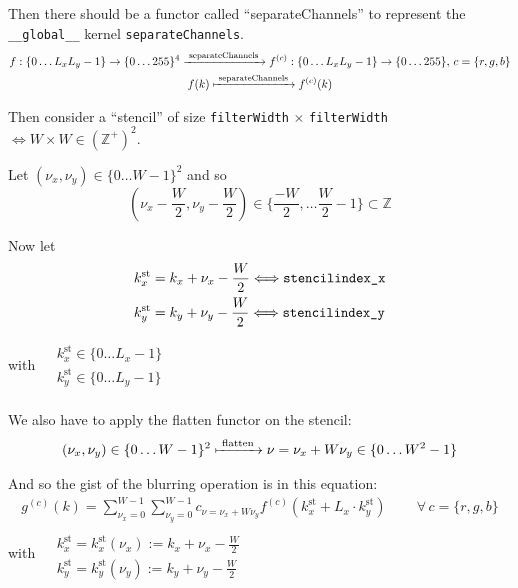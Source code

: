 \documentclass[10pt]{amsart}
\begin{document}
\begin{multicols*}{2}
Then there should be a functor called ``separateChannels'' to represent the \verb|__global__| kernel \verb|separateChannels|.
\[
\begin{gathered}
  f: \lbrace 0 \dots L_x L_y - 1 \rbrace \to \lbrace 0 \dots 255 \rbrace^4 \xrightarrow{ \text{ separateChannels } } f^{(c)}:\lbrace 0 \dots L_xL_y -1 \rbrace \to \lbrace 0 \dots 255 \rbrace , \, c = \lbrace r,g,b \rbrace \\ 
 f(k) \xmapsto{ \text{ separateChannels } } f^{(c)}(k)
\end{gathered}
\]

Then consider a ``stencil'' of size \verb|filterWidth| $\times$ \verb|filterWidth| $\Longleftrightarrow W \times W \in (\mathbb{Z}^+)^2$.

Let $(\nu_x,\nu_y) \in \lbrace 0 \dots W-1 \rbrace^2$ and so
\[
\left( \nu_x - \frac{W}{2} , \nu_y - \frac{W}{2} \right) \in \lbrace \frac{-W}{2} , \dots \frac{W}{2} - 1 \rbrace \subset \mathbb{Z}
\]

Now let
\[
\begin{aligned}
  &  k_x^{\text{st}} = k_x  + \nu_x - \frac{W}{2} \Longleftrightarrow \verb|stencilindex_x| \\ 
  & k_y^{\text{st}} = k_y  + \nu_y - \frac{W}{2} \Longleftrightarrow \verb|stencilindex_y| 
\end{aligned}
\]
with $\begin{aligned} & \quad \\
 &  k_x^{\text{st}} \in \lbrace 0 \dots L_x -1 \rbrace \\ 
  &  k_y^{\text{st}} \in \lbrace 0 \dots L_y -1 \rbrace \\
  \end{aligned}$

We also have to apply the flatten functor on the stencil:
\[
\begin{gathered}
  (\nu_x,\nu_y) \in \lbrace 0 \dots W-1\rbrace^2 \xmapsto{ \text{ flatten } } \nu = \nu_x + W \nu_y \in \lbrace 0 \dots W^2 -1 \rbrace
  \end{gathered}
\]

And so the gist of the blurring operation is in this equation:
\begin{equation}
\begin{gathered}
  g^{(c)}(k) = \sum_{\nu_x=0}^{W-1} \sum_{\nu_y =0}^{W-1} c_{\nu = \nu_x + W\nu_y} f^{(c)}(k_x^{\text{st}} + L_x \cdot k_y^{\text{st}} ) \qquad \, \forall \, c = \lbrace r,g,b\rbrace 
  \end{gathered}
  \end{equation}
with $\begin{aligned} & \quad \\
  & k_x^{\text{st}} = k_x^{\text{st}}(\nu_x) := k_x + \nu_x - \frac{W}{2} \\ 
  & k_y^{\text{st}} = k_y^{\text{st}}(\nu_y) := k_y + \nu_y - \frac{W}{2} 
  \end{aligned}$


\end{multicols*}
\end{document}

